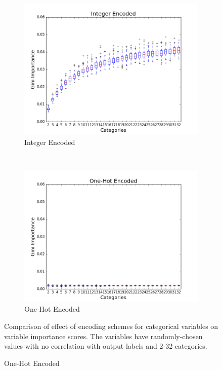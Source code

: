 \begin{figure}[H]
  \centering
  \caption{Effect of Encoding Scheme on Variable Importance Scores}
  \begin{subfigure}[b]{0.45\textwidth}
    \includegraphics[width=\textwidth]{figures/random_forests/rf_bias_integer}
    \caption{Integer Encoded}
    \label{fig:integer}
  \end{subfigure}
  ~
  \begin{subfigure}[b]{0.45\textwidth}
    \includegraphics[width=\textwidth]{figures/random_forests/rf_bias_onehot}
    \caption{One-Hot Encoded}
    \label{fig:one-hot}
  \end{subfigure}

  Comparison of effect of encoding schemes for categorical variables on variable importance scores. The variables have randomly-chosen values with no correlation with output labels and 2-32 categories.
  \label{fig:encoding-schemes}
\end{figure}

